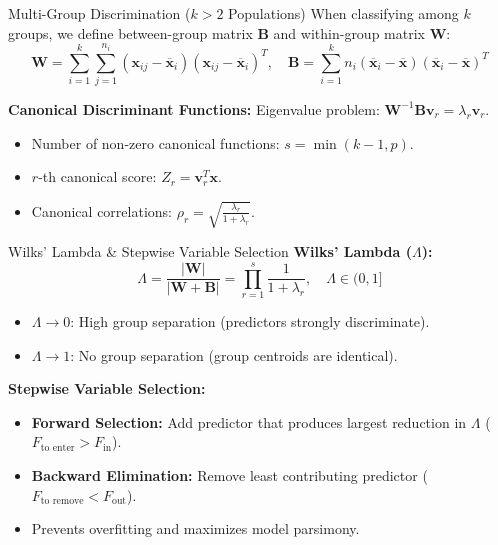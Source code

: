 \documentclass[aspectratio=169,ignorenonframetext]{beamer}
\begin{document}
\begin{frame}{Multi-Group Discrimination (\(k > 2\) Populations)}
When classifying among \(k\) groups, we define between-group matrix
\(\mathbf{B}\) and within-group matrix \(\mathbf{W}\):
\[\mathbf{W} = \sum_{i = 1}^{k}\sum_{j = 1}^{n_{i}}\left( \mathbf{x}_{ij} - {\overline{\mathbf{x}}}_{i} \right)\left( \mathbf{x}_{ij} - {\overline{\mathbf{x}}}_{i} \right)^{T},\quad\mathbf{B} = \sum_{i = 1}^{k}n_{i}\left( {\overline{\mathbf{x}}}_{i} - \overline{\mathbf{x}} \right)\left( {\overline{\mathbf{x}}}_{i} - \overline{\mathbf{x}} \right)^{T}\]

\textbf{Canonical Discriminant Functions:} Eigenvalue problem:
\(\mathbf{W}^{- 1}\mathbf{B}\mathbf{v}_{r} = \lambda_{r}\mathbf{v}_{r}\).

\begin{itemize}
\item
  Number of non-zero canonical functions: \(s = \min(k - 1,p)\).
\item
  \(r\)-th canonical score: \(Z_{r} = \mathbf{v}_{r}^{T}\mathbf{x}\).
\item
  Canonical correlations:
  \(\rho_{r} = \sqrt{\frac{\lambda_{r}}{1 + \lambda_{r}}}\).
\end{itemize}
\end{frame}

\begin{frame}{Wilks' Lambda \& Stepwise Variable Selection}
\textbf{Wilks' Lambda (\(\Lambda\)):}
\[\Lambda = \frac{|\mathbf{W}|}{|\mathbf{W} + \mathbf{B}|} = \prod_{r = 1}^{s}\frac{1}{1 + \lambda_{r}},\quad\Lambda \in (0,1\rbrack\]

\begin{itemize}
\item
  \(\Lambda \rightarrow 0\): High group separation (predictors strongly
  discriminate).
\item
  \(\Lambda \rightarrow 1\): No group separation (group centroids are
  identical).
\end{itemize}

\textbf{Stepwise Variable Selection:}

\begin{itemize}
\item
  \textbf{Forward Selection:} Add predictor that produces largest
  reduction in \(\Lambda\) (\(F_{\text{to enter}} > F_{\text{in}}\)).
\item
  \textbf{Backward Elimination:} Remove least contributing predictor
  (\(F_{\text{to remove}} < F_{\text{out}}\)).
\item
  Prevents overfitting and maximizes model parsimony.
\end{itemize}
\end{frame}
\end{document}

